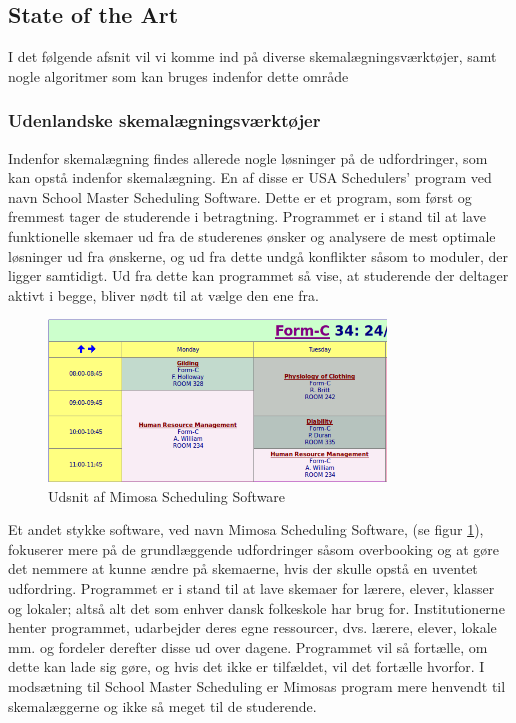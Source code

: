 \subsection{State of the Art}
I det følgende afsnit vil vi komme ind på diverse skemalægningsværktøjer, samt nogle algoritmer som kan bruges indenfor dette område
\label{sota}

\subsubsection{Udenlandske skemalægningsværktøjer}
Indenfor skemalægning findes allerede nogle løsninger på de udfordringer, som kan opstå indenfor skemalægning. En af disse er USA Schedulers' program ved navn School Master Scheduling Software\cite{USAS}. Dette er et program, som først og fremmest tager de studerende i betragtning. Programmet er i stand til at lave funktionelle skemaer ud fra de studerenes ønsker og analysere de mest optimale løsninger ud fra ønskerne, og ud fra dette undgå konflikter såsom to moduler, der ligger samtidigt. Ud fra dette kan programmet så vise, at studerende der deltager aktivt i begge, bliver nødt til at vælge den ene fra.
\begin{figure}[h!]
	\centering
	\includegraphics[width=0.8\textwidth]{../Billeder/MimosaSoftware.png}
	\caption{Udsnit af Mimosa Scheduling Software\cite{mimosaPicture}}
	\label{fig:Mimosa}
\end{figure}
\FloatBarrier
Et andet stykke software, ved navn Mimosa Scheduling Software\cite{Mimosa}, (se figur \ref{fig:Mimosa}), fokuserer mere på de grundlæggende udfordringer såsom overbooking og at gøre det nemmere at kunne ændre på skemaerne, hvis der skulle opstå en uventet udfordring. Programmet er i stand til at lave skemaer for lærere, elever, klasser og lokaler; altså alt det som enhver dansk folkeskole har brug for. Institutionerne henter programmet, udarbejder deres egne ressourcer, dvs. lærere, elever, lokale mm. og fordeler derefter disse ud over dagene. Programmet vil så fortælle, om dette kan lade sig gøre, og hvis det ikke er tilfældet, vil det fortælle hvorfor\cite{MimosaTutorial}. I modsætning til School Master Scheduling er Mimosas program mere henvendt til skemalæggerne og ikke så meget til de studerende. 

